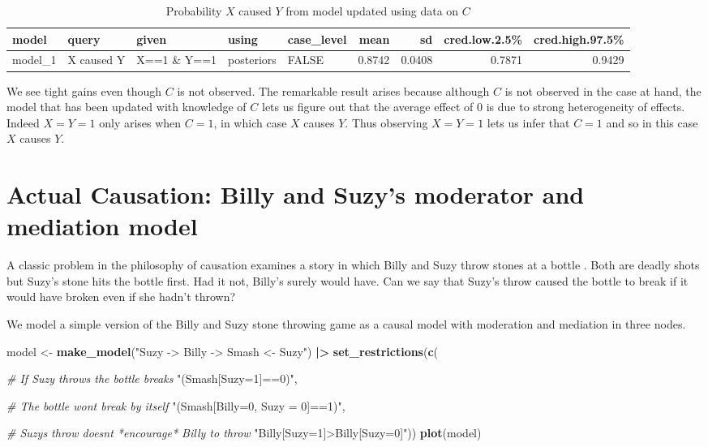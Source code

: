 \documentclass[
  12pt,
]{book}
\newenvironment{Shaded}{\begin{snugshade}}{\end{snugshade}}
\newcommand{\CommentTok}[1]{\textcolor[rgb]{0.56,0.35,0.01}{\textit{#1}}}
\newcommand{\FunctionTok}[1]{\textcolor[rgb]{0.13,0.29,0.53}{\textbf{#1}}}
\newcommand{\NormalTok}[1]{#1}
\newcommand{\OtherTok}[1]{\textcolor[rgb]{0.56,0.35,0.01}{#1}}
\newcommand{\SpecialCharTok}[1]{\textcolor[rgb]{0.81,0.36,0.00}{\textbf{#1}}}
\newcommand{\StringTok}[1]{\textcolor[rgb]{0.31,0.60,0.02}{#1}}
\begin{document}
\begin{table}

\caption{\label{tab:unnamed-chunk-82}Probability $X$ caused $Y$ from model updated using data on $C$}
\centering
\begin{tabular}[t]{l|l|l|l|l|r|r|r|r}
\hline
model & query & given & using & case\_level & mean & sd & cred.low.2.5\% & cred.high.97.5\%\\
\hline
model\_1 & X caused Y & X==1 \& Y==1 & posteriors & FALSE & 0.8742 & 0.0408 & 0.7871 & 0.9429\\
\hline
\end{tabular}
\end{table}

We see tight gains even though \(C\) is not observed. The remarkable result arises because although \(C\) is not observed in the case at hand, the model that has been updated with knowledge of \(C\) lets us figure out that the average effect of 0 is due to strong heterogeneity of effects. Indeed \(X=Y=1\) only arises when \(C=1\), in which case \(X\) causes \(Y\). Thus observing \(X=Y=1\) lets us infer that \(C=1\) and so in this case \(X\) causes \(Y\).

\hypertarget{Billy}{%
\section{Actual Causation: Billy and Suzy's moderator and mediation model}\label{Billy}}

A classic problem in the philosophy of causation examines a story in which Billy and Suzy throw stones at a bottle \citep{hall2004two}. Both are deadly shots but Suzy's stone hits the bottle first. Had it not, Billy's surely would have. Can we say that Suzy's throw caused the bottle to break if it would have broken even if she hadn't thrown?

We model a simple version of the Billy and Suzy stone throwing game as a causal model with moderation and mediation in three nodes.

\begin{Shaded}
\begin{Highlighting}[]
\NormalTok{model }\OtherTok{\textless{}{-}} \FunctionTok{make\_model}\NormalTok{(}\StringTok{"Suzy {-}\textgreater{} Billy {-}\textgreater{} Smash \textless{}{-} Suzy"}\NormalTok{) }\SpecialCharTok{|\textgreater{}}
         \FunctionTok{set\_restrictions}\NormalTok{(}\FunctionTok{c}\NormalTok{(}
           
           \CommentTok{\# If Suzy throws the bottle breaks}
           \StringTok{"(Smash[Suzy=1]==0)"}\NormalTok{,}

           \CommentTok{\# The bottle won\textquotesingle{}t break by itself}
           \StringTok{"(Smash[Billy=0, Suzy = 0]==1)"}\NormalTok{,}
           
           \CommentTok{\# Suzy\textquotesingle{}s throw doesn\textquotesingle{}t *encourage* Billy to throw}
           \StringTok{"Billy[Suzy=1]\textgreater{}Billy[Suzy=0]"}\NormalTok{))}
\FunctionTok{plot}\NormalTok{(model)}
\end{Highlighting}
\end{Shaded}
\end{document}
